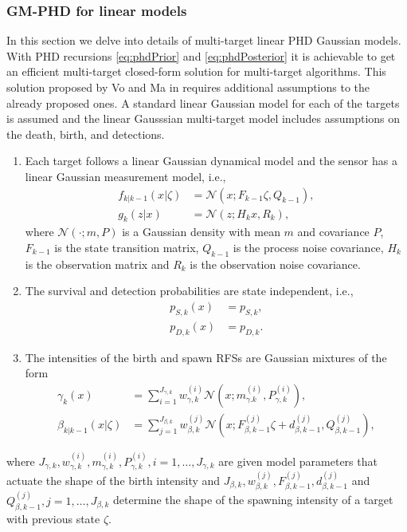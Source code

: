         \subsubsection{GM-PHD for linear models}
\label{sec:gmphdFilter}
In this section we delve into details of multi-target linear PHD Gaussian models. With PHD recursions \eqref{eq:phdPrior} and \eqref{eq:phdPosterior} it is achievable to get an efficient multi-target closed-form solution for multi-target algorithms. This solution proposed by Vo and Ma in \cite{VoMaPHD2006} requires additional assumptions to the already proposed ones. A standard linear Gaussian model for each of the targets is assumed and the linear Gausssian multi-target model includes assumptions on the death, birth, and detections.
\begin{enumerate}[start=4]
    \item  Each target follows a linear Gaussian dynamical model and the sensor has a linear Gaussian measurement model, i.e., \label{as:phd_4}
        \begin{align}
            f_{k|k-1}(x|\zeta) &= \mathcal{N}(x; F_{k-1}\zeta, Q_{k-1}), \label{eq:phd_linear_model_state}\\
            g_k(z|x) &= \mathcal{N}(z;H_kx, R_k), \label{eq:phd_linear_model_measurements}
        \end{align}
        where $\mathcal{N}(\cdot;m,P)$ is a Gaussian density with mean $m$ and covariance $P$, $F_{k-1}$ is the state transition matrix, $Q_{k-1}$ is the process noise covariance, $H_k$ is the observation matrix and $R_k$ is the observation noise covariance.
    \item The survival and detection probabilities are state independent, i.e., \label{as:phd_5}
        \begin{align}
            p_{S,k}(x) &= p_{S,k}, \label{eq:phd_ps}\\
            p_{D,k}(x) &= p_{D,k}. \label{eq:phd_pd}
        \end{align}
    \item The intensities of the birth and spawn RFSs are Gaussian mixtures of the form \label{as:phd_6}
        \begin{align}
            \gamma_k(x) &= \sum_{i=1}^{J_{\gamma,k}}w_{\gamma,k}^{(i)} \mathcal{N}(x; m_{\gamma.k}^{(i)}, P_{\gamma,k}^{(i)}), \label{eq:phd_birth_intensity} \\
            \beta_{k|k-1}(x|\zeta) &= \sum_{j=1}^{J_{\beta,k}} w_{\beta,k}^{(j)} \mathcal{N}(x;F_{\beta,k-1}^{(j)}\zeta + d_{\beta,k-1}^{(j)}, Q_{\beta,k-1}^{(j)}), \label{eq:phd_spawning_intensity}
        \end{align}
\end{enumerate}
where $J_{\gamma,k}, w_{\gamma,k}^{(i)}, m_{\gamma,k}^{(i)}, P_{\gamma,k}^{(i)}, i=1,\dots, J_{\gamma,k}$ are given model parameters that actuate the shape of the birth intensity and $J_{\beta,k}, w_{\beta,k}^{(j)}, F_{\beta,k-1}^{(j)}, d_{\beta,k-1}^{(j)}$ and $Q_{\beta,k-1}^{(j)}, j=1,\dots, J_{\beta,k}$ determine the shape of the spawning intensity of a target with previous state $\zeta$.

